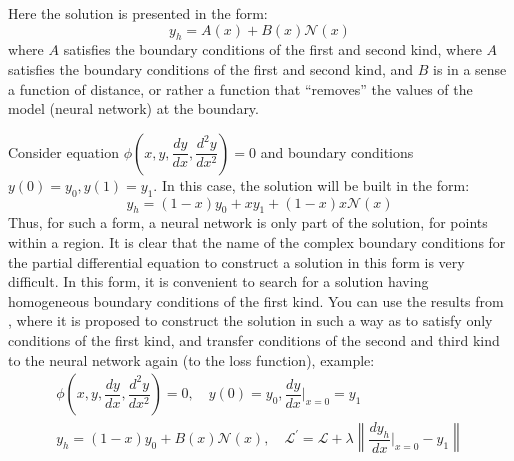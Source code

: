 Here the solution is presented in the form:
\begin{equation}
	\label{eq:simple_solver}
	y_h = A(x) + B(x) \mathcal{N}(x)
\end{equation}
where $A$ satisfies the boundary conditions of the first and second kind, where $A$ satisfies the boundary conditions of the first and second kind, and $B$ is in a sense a function of distance, or rather a function that “removes” the values of the model (neural network) at the boundary. 

Consider equation $\phi \left ( x, y, \dfrac{d y}{d x}, \dfrac{d^2 y}{d x^2} \right ) = 0$ and boundary conditions $y(0) = y_0, y(1) = y_1$. In this case, the solution will be built in the form:
\begin{equation*}
	y_h = (1 - x) y_0 + x y_1 + (1 - x) x \mathcal{N}(x)
\end{equation*}
Thus, for such a form, a neural network is only part of the solution, for points within a region. It is clear that the name of the complex boundary conditions for the partial differential equation to construct a solution in this form is very difficult. In this form, it is convenient to search for a solution having homogeneous boundary conditions of the first kind. You can use the results from \cite{fletcher2012computational}, where it is proposed to construct the solution in such a way as to satisfy only conditions of the first kind, and transfer conditions of the second and third kind to the neural network again (to the loss function), example:
\begin{equation*}
	\begin{multlined}
		\phi \left ( x, y, \dfrac{d y}{d x}, \dfrac{d^2 y}{d x^2} \right ) = 0, \quad y(0) =  y_0, \dfrac{d y}{d x} \Big|_{x = 0} = y_1 \\
		y_h = (1 - x) y_0 + B(x) \mathcal{N}(x), \quad \mathcal{L}^{'} = \mathcal{L} + \lambda \left \| \dfrac{d y_h}{d x}\Big|_{x = 0} - y_1  \right \|
	\end{multlined}
\end{equation*}
